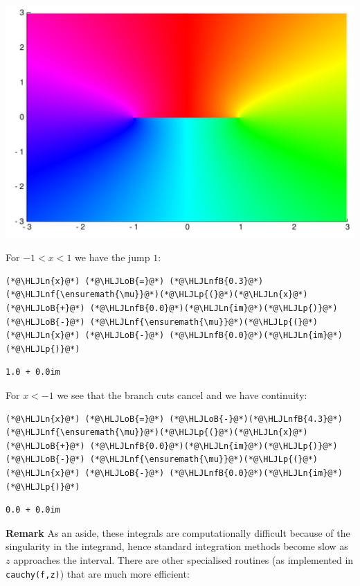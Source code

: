 \documentclass[12pt,a4paper]{article}
\newcommand{\HLJLn}[1]{#1}
\newcommand{\HLJLnf}[1]{\textcolor[RGB]{66,102,213}{#1}}
\newcommand{\HLJLnfB}[1]{\textcolor[RGB]{59,151,46}{#1}}
\newcommand{\HLJLoB}[1]{\textcolor[RGB]{102,102,102}{\textbf{#1}}}
\newcommand{\HLJLp}[1]{#1}
\begin{document}
\includegraphics[width=\linewidth]{figures/Lecture12_7_1.pdf}

For $-1 < x < 1$ we have the jump $1$:


\begin{lstlisting}
(*@\HLJLn{x}@*) (*@\HLJLoB{=}@*) (*@\HLJLnfB{0.3}@*)
(*@\HLJLnf{\ensuremath{\mu}}@*)(*@\HLJLp{(}@*)(*@\HLJLn{x}@*) (*@\HLJLoB{+}@*) (*@\HLJLnfB{0.0}@*)(*@\HLJLn{im}@*)(*@\HLJLp{)}@*) (*@\HLJLoB{-}@*) (*@\HLJLnf{\ensuremath{\mu}}@*)(*@\HLJLp{(}@*)(*@\HLJLn{x}@*) (*@\HLJLoB{-}@*) (*@\HLJLnfB{0.0}@*)(*@\HLJLn{im}@*)(*@\HLJLp{)}@*)
\end{lstlisting}

\begin{lstlisting}
1.0 + 0.0im
\end{lstlisting}


For $x < -1$ we see that the branch cuts cancel and we have continuity:


\begin{lstlisting}
(*@\HLJLn{x}@*) (*@\HLJLoB{=}@*) (*@\HLJLoB{-}@*)(*@\HLJLnfB{4.3}@*)
(*@\HLJLnf{\ensuremath{\mu}}@*)(*@\HLJLp{(}@*)(*@\HLJLn{x}@*) (*@\HLJLoB{+}@*) (*@\HLJLnfB{0.0}@*)(*@\HLJLn{im}@*)(*@\HLJLp{)}@*) (*@\HLJLoB{-}@*) (*@\HLJLnf{\ensuremath{\mu}}@*)(*@\HLJLp{(}@*)(*@\HLJLn{x}@*) (*@\HLJLoB{-}@*) (*@\HLJLnfB{0.0}@*)(*@\HLJLn{im}@*)(*@\HLJLp{)}@*)
\end{lstlisting}

\begin{lstlisting}
0.0 + 0.0im
\end{lstlisting}


\textbf{Remark} As an aside, these integrals are computationally difficult because of the singularity in the integrand,  hence standard integration methods become slow as $z$ approaches the interval.  There are other specialised routines (as implemented in \texttt{cauchy(f,z)}) that are much more efficient:
\end{document}
